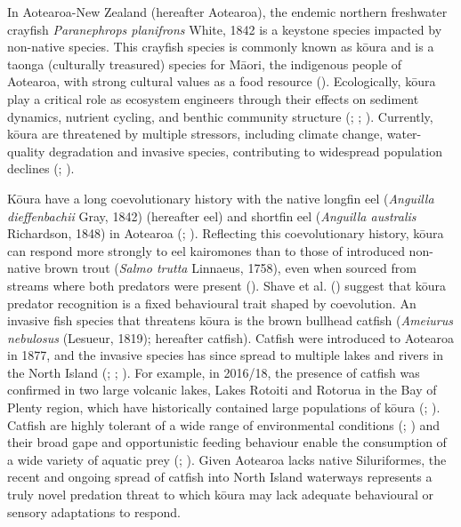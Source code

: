 \documentclass[
  letterpaper,
  DIV=11,
  numbers=noendperiod]{scrartcl}
\begin{document}
In Aotearoa-New Zealand (hereafter Aotearoa), the endemic northern
freshwater crayfish \emph{Paranephrops planifrons} White, 1842 is a
keystone species impacted by non-native species. This crayfish species
is commonly known as kōura and is a taonga (culturally treasured)
species for Māori, the indigenous people of Aotearoa, with strong
cultural values as a food resource (). Ecologically, kōura play a critical role as ecosystem
engineers through their effects on sediment dynamics, nutrient cycling,
and benthic community structure (; ;
). Currently, kōura are
threatened by multiple stressors, including climate change,
water-quality degradation and invasive species, contributing to
widespread population declines (;
).

Kōura have a long coevolutionary history with the native longfin eel
(\emph{Anguilla dieffenbachii} Gray, 1842) (hereafter eel) and shortfin
eel (\emph{Anguilla australis} Richardson, 1848) in Aotearoa
(;
). Reflecting this
coevolutionary history, kōura can respond more strongly to eel
kairomones than to those of introduced non-native brown trout
(\emph{Salmo trutta} Linnaeus, 1758), even when sourced from streams
where both predators were present (). Shave et al. () suggest that kōura
predator recognition is a fixed behavioural trait shaped by coevolution.
An invasive fish species that threatens kōura is the brown bullhead
catfish (\emph{Ameiurus nebulosus} (Lesueur, 1819); hereafter catfish).
Catfish were introduced to Aotearoa in 1877, and the invasive species
has since spread to multiple lakes and rivers in the North Island
(;
;
). For example, in 2016/18, the
presence of catfish was confirmed in two large volcanic lakes, Lakes
Rotoiti and Rotorua in the Bay of Plenty region, which have historically
contained large populations of kōura (; ). Catfish are highly
tolerant of a wide range of environmental conditions
(;
) and their broad gape and
opportunistic feeding behaviour enable the consumption of a wide variety
of aquatic prey (;
). Given Aotearoa lacks native
Siluriformes, the recent and ongoing spread of catfish into North Island
waterways represents a truly novel predation threat to which kōura may
lack adequate behavioural or sensory adaptations to respond.
\end{document}
